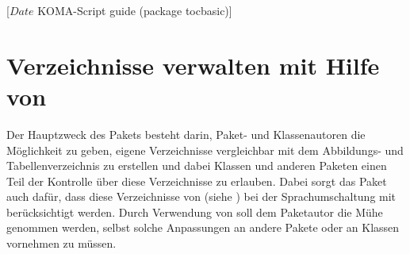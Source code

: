 %
%
%
%
%
%
%
%
% 
%
%
%
%

                 [$Date$
                  KOMA-Script guide (package tocbasic)]

\chapter{Verzeichnisse verwalten mit Hilfe von }

\BeginIndexGroup
{}%
%
%
Der Hauptzweck des Pakets  besteht darin, Paket- und
Klassenautoren die Möglichkeit zu geben, eigene Verzeichnisse vergleichbar mit
dem Abbildungs- und Tabellenverzeichnis zu erstellen und dabei Klassen und
anderen Paketen einen Teil der Kontrolle über diese Verzeichnisse zu
erlauben. Dabei sorgt das Paket  auch dafür, dass diese
Verzeichnisse von  (siehe
\cite{package:babel}) bei der Sprachumschaltung mit berücksichtigt
werden. Durch Verwendung von  soll dem Paketautor die Mühe
genommen werden, selbst solche Anpassungen an andere Pakete oder an Klassen
vornehmen zu müssen.

